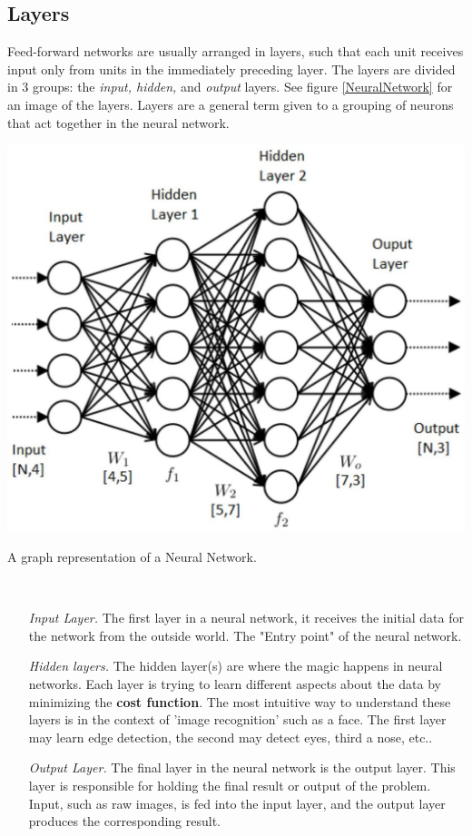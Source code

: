 \documentclass{tufte-handout}
\begin{document}
\subsection{Layers}
\label{sub:Layers}
Feed-forward networks are usually arranged in layers, such that each unit receives input
only from units in the immediately preceding layer. The layers are divided in 3 groups: the \textit{input, hidden,} and \textit{output} layers. See figure \ref{NeuralNetwork} for an image of the layers. Layers are a general term given to a grouping of neurons that act together in the neural network.
\begin{marginfigure}
  \includegraphics{NeuralNetwork}
  \label{NeuralNetwork}
  \caption{A graph representation of a Neural Network.}
\end{marginfigure}
\begin{definition}[Layers] $  $
  \begin{enumerate}
    \item[\it Input Layer.] The first layer in a neural network, it receives the initial data for the network from the outside world. The "Entry point" of the neural network.
    \item[\it Hidden layers.] The hidden layer(s) are where the magic happens in neural networks. Each layer is trying to learn different aspects about the data by minimizing the \textbf{cost function}. The most intuitive way to understand these layers is in the context of 'image recognition' such as a face. The first layer may learn edge detection, the second may detect eyes, third a nose, etc.\cite{layers}.
    \item[\it Output Layer.] The final layer in the neural network is the output layer. This layer is responsible for holding the final result or output of the problem. Input, such as raw images, is fed into the input layer, and the output layer produces the corresponding result.
\end{enumerate}

\end{definition}
\end{document}
